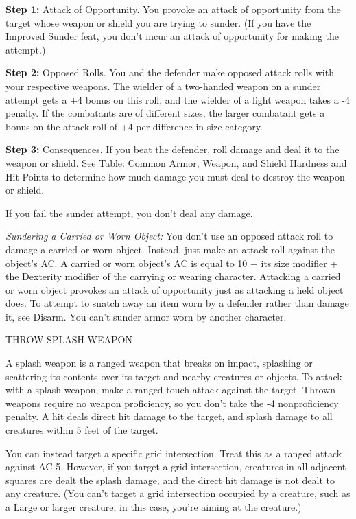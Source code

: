 \documentclass{article}
\begin{document}
\vspace{12pt}
\textbf{Step 1:} Attack of Opportunity. You provoke an attack of opportunity from 
the target whose weapon or shield you are trying to sunder. (If you have the Improved 
Sunder feat, you don't incur an attack of opportunity for making the attempt.)

\textbf{Step 2: }Opposed Rolls. You and the defender make opposed attack rolls 
with your respective weapons. The wielder of a two-handed weapon on a sunder attempt 
gets a +4 bonus on this roll, and the wielder of a light weapon takes a -4 penalty. 
If the combatants are of different sizes, the larger combatant gets a bonus on 
the attack roll of +4 per difference in size category.

\textbf{Step 3:} Consequences. If you beat the defender, roll damage and deal it 
to the weapon or shield. See Table: Common Armor, Weapon, and Shield Hardness and 
Hit Points to determine how much damage you must deal to destroy the weapon or 
shield.

If you fail the sunder attempt, you don't deal any damage.

\textit{Sundering a Carried or Worn Object: }You don't use an opposed attack roll 
to damage a carried or worn object. Instead, just make an attack roll against the 
object's AC. A carried or worn object's AC is equal to 10 + its size modifier + 
the Dexterity modifier of the carrying or wearing character. Attacking a carried 
or worn object provokes an attack of opportunity just as attacking a held object 
does. To attempt to snatch away an item worn by a defender rather than damage it, 
see Disarm. You can't sunder armor worn by another character.

\vspace{12pt}
THROW SPLASH WEAPON

A splash weapon is a ranged weapon that breaks on impact, splashing or scattering 
its contents over its target and nearby creatures or objects. To attack with a 
splash weapon, make a ranged touch attack against the target. Thrown weapons require 
no weapon proficiency, so you don't take the -4 nonproficiency penalty. A hit deals 
direct hit damage to the target, and splash damage to all creatures within 5 feet 
of the target.

You can instead target a specific grid intersection. Treat this as a ranged attack 
against AC 5. However, if you target a grid intersection, creatures in all adjacent 
squares are dealt the splash damage, and the direct hit damage is not dealt to 
any creature. (You can't target a grid intersection occupied by a creature, such 
as a Large or larger creature; in this case, you're aiming at the creature.)
\end{document}
